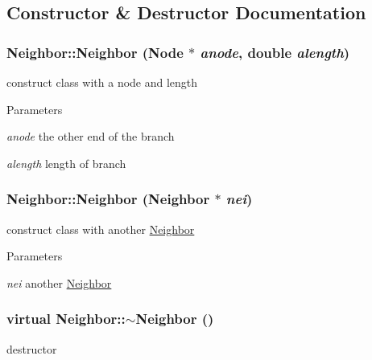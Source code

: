 \subsection{Constructor \& Destructor Documentation}
\hypertarget{classNeighbor_a5fce1b4b3ca5dc76bb7ba042b76786cb}{
\subsubsection[{Neighbor}]{\setlength{\rightskip}{0pt plus 5cm}Neighbor::Neighbor ({\bf Node} $\ast$ {\em anode}, \/  double {\em alength})}}
\label{classNeighbor_a5fce1b4b3ca5dc76bb7ba042b76786cb}
construct class with a node and length 
\begin{DoxyParams}{Parameters}
\item[{\em anode}]the other end of the branch \item[{\em alength}]length of branch \end{DoxyParams}
\hypertarget{classNeighbor_aa93ef5611e62a5249e743465df3845ad}{
\subsubsection[{Neighbor}]{\setlength{\rightskip}{0pt plus 5cm}Neighbor::Neighbor ({\bf Neighbor} $\ast$ {\em nei})}}
\label{classNeighbor_aa93ef5611e62a5249e743465df3845ad}
construct class with another \hyperlink{classNeighbor}{Neighbor} 
\begin{DoxyParams}{Parameters}
\item[{\em nei}]another \hyperlink{classNeighbor}{Neighbor} \end{DoxyParams}
\hypertarget{classNeighbor_a5dc94080d5904a504dfe3bcc7e9e14bb}{
\subsubsection[{$\sim$Neighbor}]{\setlength{\rightskip}{0pt plus 5cm}virtual Neighbor::$\sim$Neighbor ()}}
\label{classNeighbor_a5dc94080d5904a504dfe3bcc7e9e14bb}
destructor 

